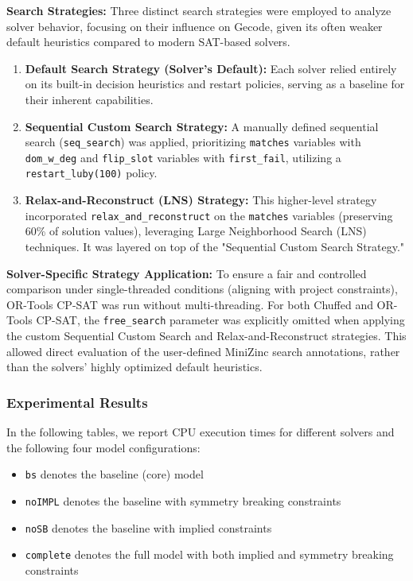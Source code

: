 \textbf{Search Strategies:}
Three distinct search strategies were employed to analyze solver behavior, focusing on their influence on Gecode, given its often weaker default heuristics compared to modern SAT-based solvers.

\begin{enumerate}
    \item \textbf{Default Search Strategy (Solver's Default):} Each solver relied entirely on its built-in decision heuristics and restart policies, serving as a baseline for their inherent capabilities.

    \item \textbf{Sequential Custom Search Strategy:} A manually defined sequential search (\texttt{seq\_search}) was applied, prioritizing \texttt{matches} variables with \texttt{dom\_w\_deg} and \texttt{flip\_slot} variables with \texttt{first\_fail}, utilizing a \\ \texttt{restart\_luby(100)} policy.

    \item \textbf{Relax-and-Reconstruct (LNS) Strategy:} This higher-level strategy incorporated \texttt{relax\_and\_reconstruct} on the \texttt{matches} variables (preserving 60\% of solution values), leveraging Large Neighborhood Search (LNS) techniques. It was layered on top of the "Sequential Custom Search Strategy."
\end{enumerate}

\textbf{Solver-Specific Strategy Application:}
To ensure a fair and controlled comparison under single-threaded conditions (aligning with project constraints), OR-Tools CP-SAT was run without multi-threading. For both Chuffed and OR-Tools CP-SAT, the \texttt{free\_search} parameter was explicitly omitted when applying the custom Sequential Custom Search and Relax-and-Reconstruct strategies. This allowed direct evaluation of the user-defined MiniZinc search annotations, rather than the solvers' highly optimized default heuristics.


\subsubsection{Experimental Results}
In the following tables, we report CPU execution times for different solvers and the following four model configurations:
\begin{itemize}
    \item \texttt{bs} denotes the baseline (core) model
     \item  \texttt{noIMPL} denotes the baseline with symmetry breaking constraints
    \item \texttt{noSB} denotes the baseline with implied constraints
    \item \texttt{complete} denotes the full model with both implied and symmetry breaking constraints
\end{itemize}


